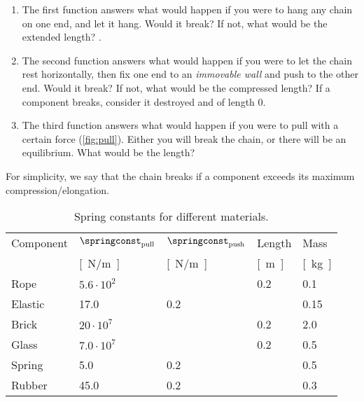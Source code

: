 \begin{gradedexercise}
\begin{enumerate}
              \begin{enumerate}
                  \item The first function answers what would happen if you were to hang any chain on one end, and let it hang.
                        Would it break?
                        If not, what would be the extended length?
                        .
                  \item The second function answers what would happen if you were to let the chain rest horizontally, then fix one end to an \emph{immovable wall} and push to the other end.
                        Would it break?
                        If not, what would be the compressed length?
                        If a component breaks, consider it destroyed and of length 0.
                  \item The third function answers what would happen if you were to pull with a certain force (\cref{fig:pull}).
                        Either you will break the chain, or there will be an equilibrium.
                        What would be the length?
              \end{enumerate}

              \begin{hint}
                  For simplicity, we say that the chain breaks if a component exceeds its maximum compression/elongation.
              \end{hint}
    \end{enumerate}
\end{gradedexercise}



\begin{table}
    \centering
    \footnotesize
    \begin{tabular}{lllll}
        Component & $\springconst_\mathrm{pull}$ & $\springconst_\mathrm{push}$ & Length       & Mass \\
                  & \unit[]{[N/m]}               & \unit[]{[N/m]}               & \unit[]{[m]} & \unit[]{[kg]} \\
        \toprule
        Rope      & $5.6\cdot 10^2$              &                              & 0.2          & 0.1 \\
        Elastic   & 17.0                         & 0.2                          &              & 0.15 \\
        Brick     & $20\cdot 10^7$               &                              & 0.2          & 2.0 \\
        Glass     & $7.0\cdot 10^7$              &                              & 0.2          & 0.5 \\
        Spring    & 5.0                          & 0.2                          &              & 0.5 \\
        Rubber    & 45.0                         & 0.2                          &              & 0.3
    \end{tabular}
    \caption{Spring constants for different materials.
    }
    \label{tab:spring_const}
\end{table}

